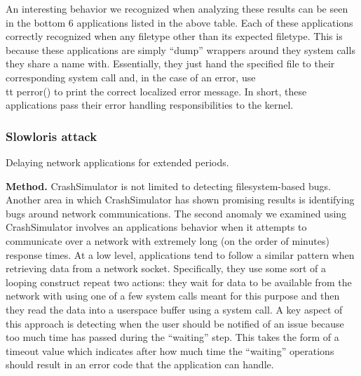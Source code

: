 An interesting behavior we recognized when analyzing these results can be
seen in the bottom 6 applications listed in the above table.  Each of these
applications correctly recognized when any filetype other than its expected
filetype.  This is because these applications are simply ``dump'' wrappers
around they system calls they share a name with.  Essentially, they just
hand the specified file to their corresponding system call and, in the case
of an error, use {\\tt perror()} to print the correct localized error
message.  In short, these applications pass their error handling
responsibilities to the kernel.

\subsubsection{Slowloris attack} Delaying network applications for extended
periods.




{\bf Method.}
CrashSimulator is not limited to detecting filesystem-based bugs.  Another area
in which CrashSimulator has shown promising results is identifying bugs around
network communications.  The second anomaly we examined using CrashSimulator
involves an applications behavior when it attempts to communicate over a network
with extremely long (on the order of minutes) response times.  At a low level,
applications tend to follow a similar pattern when retrieving data from a
network socket.  Specifically, they use some sort of a looping construct repeat
two actions: they wait for data to be available from the network with using one
of a few system calls meant for this purpose and then they read the data
into a userspace buffer using a system call.  A key aspect of this approach is
detecting when the user should be notified of an issue because too much time has
passed during the ``waiting'' step.  This takes the form of a timeout value
which indicates after how much time the ``waiting'' operations should result in
an error code that the application can handle.


